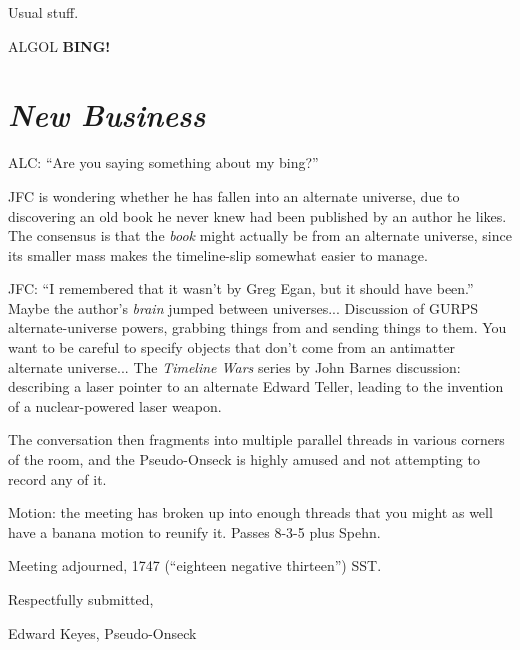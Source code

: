 \documentclass[10pt]{article}
\newcommand{\bing}{{\bf BING!} }
\newcommand{\goto}[1]{\bing \vskip 12pt \section*{{\em{#1}}}}
\newcommand{\ps}{ plus Spehn\xspace}
\begin{document}
Usual stuff.

ALGOL
\goto{New Business}

ALC: ``Are you saying something about my bing?''

JFC is wondering whether he has fallen into an alternate universe, due
to discovering an old book he never knew had been published by an author
he likes.  The consensus is that the {\em book} might actually be from an
alternate universe, since its smaller mass makes the timeline-slip
somewhat easier to manage.

JFC: ``I remembered that it wasn't by Greg Egan, but it should have been.''
Maybe the author's {\em brain} jumped between universes...  Discussion of
GURPS alternate-universe powers, grabbing things from and sending things to
them.  You want to be careful to specify objects that don't come from an
antimatter alternate universe...  The {\em Timeline Wars} series by
John Barnes discussion: describing a laser pointer to an alternate Edward
Teller, leading to the invention of a nuclear-powered laser weapon.

The conversation then fragments into multiple parallel threads in various
corners of the room, and the Pseudo-Onseck is highly amused and not
attempting to record any of it.

Motion: the meeting has broken up into enough threads that you might
as well have a banana motion to reunify it.  Passes 8-3-5\ps.

\vspace{12pt}

\noindent
Meeting adjourned, 1747 (``eighteen negative thirteen'') SST.

\vspace{18pt}

\centerline{Respectfully submitted,}
\centerline{Edward Keyes, Pseudo-Onseck}
\end{document}
